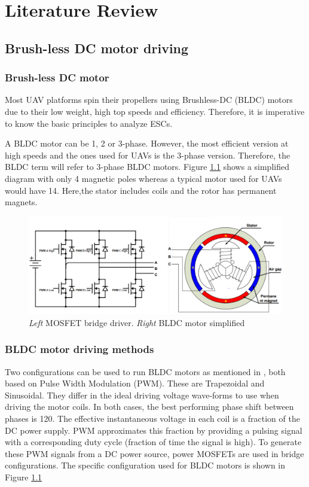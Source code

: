 \chapter{Literature Review}
\section{Brush-less DC motor driving}
\subsection{Brush-less DC motor}
Most UAV platforms spin their propellers using Brushless-DC (BLDC) motors due to their low weight, high top speeds and efficiency. Therefore, it is  imperative to know the basic principles to analyze ESCs. 

A BLDC motor can be 1, 2 or 3-phase. However, the most efficient version at high speeds and the ones used for UAVs is the 3-phase version. Therefore, the BLDC term will refer to 3-phase BLDC motors. Figure \ref{fig:bldcm} shows a simplified diagram with only 4 magnetic poles whereas a typical motor used for UAVs would have 14. Here,the stator includes coils and the rotor has permanent magnets.

\begin{figure}
    \centering
    \includegraphics[width=\textwidth]{images/bldcm_diagram.png}
    \caption{\textit{Left} MOSFET bridge driver. \textit{Right} BLDC motor simplified \cite{Zhao_BLDCFundamentals}}
    \label{fig:bldcm}
\end{figure}

\subsection{BLDC motor driving methods}
\label{sec:bldc_driving_methods}
Two configurations can be used to run BLDC motors as mentioned in \cite{Mogensen_ESC_Motor_Control2016}, both based on Pulse Width Modulation (PWM). These are Trapezoidal and Sinusoidal. They differ in the ideal driving voltage wave-forms to use when driving the motor coils. In both cases, the best performing phase shift between phases is 120\textdegree.  The effective instantaneous voltage in each coil is a fraction of the DC power supply. PWM approximates this fraction by providing a pulsing signal with a corresponding duty cycle (fraction of time the signal is high). 
To generate these PWM signals from a DC power source, power MOSFETs are used in bridge configurations. The specific configuration used for BLDC motors is shown in Figure \ref{fig:bldcm}
\newline


